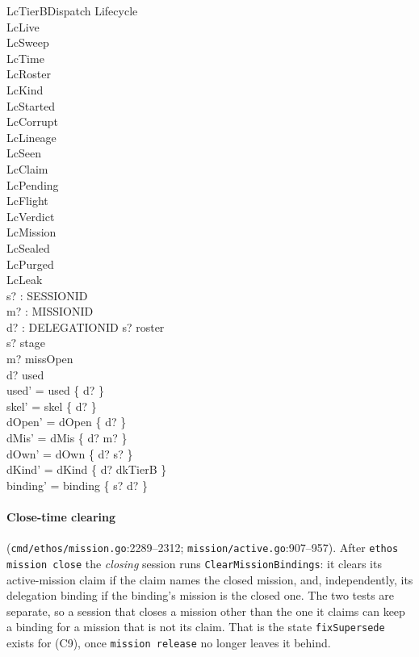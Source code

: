 \documentclass[a4paper,10pt,fleqn]{article}
\newcommand{\fpath}[1]{\texttt{#1}}
\newcommand{\field}[1]{\texttt{#1}}
\begin{document}
\begin{schema}{LcTierBDispatch}
\Delta Lifecycle \\
\Xi LcLive \\
\Xi LcSweep \\
\Xi LcTime \\
\Xi LcRoster \\
\Xi LcKind \\
\Xi LcStarted \\
\Xi LcCorrupt \\
\Xi LcLineage \\
\Xi LcSeen \\
\Xi LcClaim \\
\Xi LcPending \\
\Xi LcFlight \\
\Xi LcVerdict \\
\Xi LcMission \\
\Xi LcSealed \\
\Xi LcPurged \\
\Xi LcLeak \\
s? : SESSIONID \\
m? : MISSIONID \\
d? : DELEGATIONID
\where
s? \in roster \\
s? \notin \dom stage \\
m? \in missOpen \\
d? \notin used \\
used' = used \cup \{ d? \} \\
skel' = skel \cup \{ d? \} \\
dOpen' = dOpen \cup \{ d? \} \\
dMis' = dMis \oplus \{ d? \mapsto m? \} \\
dOwn' = dOwn \oplus \{ d? \mapsto s? \} \\
dKind' = dKind \oplus \{ d? \mapsto dkTierB \} \\
binding' = binding \oplus \{ s? \mapsto d? \}
\end{schema}

\paragraph{Close-time clearing} (\fpath{cmd/ethos/mission.go}:2289--2312;
\fpath{mission/active.go}:907--957). After \field{ethos mission close} the
\emph{closing} session runs \field{ClearMissionBindings}: it clears its
active-mission claim if the claim names the closed mission, and, independently,
its delegation binding if the binding's mission is the closed one. The two
tests are separate, so a session that closes a mission other than the one it
claims can keep a binding for a mission that is not its claim. That is the
state \field{fixSupersede} exists for (C9), once \field{mission release} no
longer leaves it behind.
\end{document}
